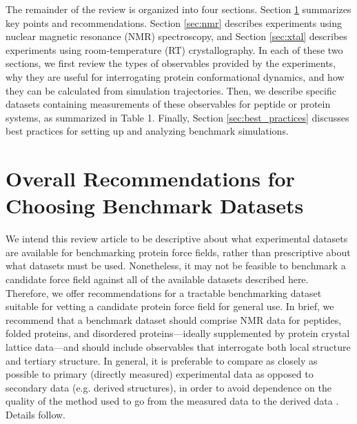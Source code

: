 \documentclass[9pt,review]{livecoms}
\begin{document}
The remainder of the review is organized into four sections.
Section \ref{sec:overall} summarizes key points and recommendations.
Section \ref{sec:nmr} describes experiments using nuclear magnetic resonance (NMR) spectroscopy, and Section \ref{sec:xtal} describes experiments using room-temperature (RT) crystallography.
In each of these two sections, we first review the types of observables provided by the experiments, why they are useful for interrogating protein conformational dynamics, and how they can be calculated from simulation trajectories.
Then, we describe specific datasets containing measurements of these observables for peptide or protein systems, as summarized in Table 1.
Finally, Section \ref{sec:best_practices} discusses best practices for setting up and analyzing benchmark simulations.

\section{Overall Recommendations for Choosing Benchmark Datasets}
\label{sec:overall}

We intend this review article to be descriptive about what experimental datasets are available for benchmarking protein force fields, rather than prescriptive about what datasets must be used.
Nonetheless, it may not be feasible to benchmark a candidate force field against all of the available datasets described here.
Therefore, we offer recommendations for a tractable benchmarking dataset suitable for vetting a candidate protein force field for general use.
In brief, we recommend that a benchmark dataset should comprise NMR data for peptides, folded proteins, and disordered proteins---ideally supplemented by protein crystal lattice data---and should include observables that interrogate both local structure and tertiary structure.
In general, it is preferable to compare as closely as possible to primary (directly measured) experimental data as opposed to secondary data (e.g. derived structures), in order to avoid dependence on the quality of the method used to go from the measured data to the derived data \cite{van_gunsteren_deriving_2016,van_gunsteren_validation_2018}.
Details follow.
\end{document}
